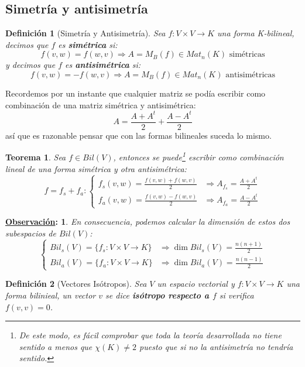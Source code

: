 \documentclass[10pt,a4paper,openright]{book}
\theoremstyle{break}
\newtheorem*{defi}{Definición}
\newtheorem*{theo}{Teorema}
\newtheorem*{obs}{\underline{Observación}:}
\begin{document}
\subsection{Simetría y antisimetría}
\begin{defi}[Simetría y Antisimetría]
Sea $f: V\times V \rightarrow K$ una forma K-bilineal, decimos que $f$ es \textbf{simétrica} si:
$$f(v,w)=f(w,v)\Rightarrow A=M_B(f)\in Mat_n(K) \mbox{ simétricas}$$
y decimos que $f$ es \textbf{antisimétrica} si:
$$f(v,w)=-f(w,v)\Rightarrow A=M_B(f)\in Mat_n(K) \mbox{ antisimétricas}$$
\end{defi}

Recordemos por un instante que cualquier matriz se podía escribir como combinación de una matriz simétrica y antisimétrica:
$$A=\frac{A+A^t}{2}+\frac{A-A^t}{2}$$
así que es razonable pensar que con las formas bilineales suceda lo mismo.

\begin{theo}
Sea $f\in Bil(V)$, entonces se puede\footnote{De este modo, es fácil comprobar que toda la teoría desarrollada no tiene sentido a menos que $\chi(K)\neq 2$ puesto que si no la antisimetría no tendría sentido.} escribir como combinación lineal de una forma simétrica y otra antisimétrica:
$$f=f_s+f_a: \begin{cases} f_s(v,w)=\frac{f(v,w)+f(w,v)}{2}& \Rightarrow A_{f_s} = \frac{A+A^t}{2} \\ f_a(v,w)=\frac{f(v,w)-f(w,v)}{2} &\Rightarrow A_{f_a} = \frac{A-A^t}{2} \end{cases}$$
\end{theo}

\begin{obs}
En consecuencia, podemos calcular la dimensión de estos dos subespacios de $Bil(V)$:
$$\begin{cases}Bil_s(V)=\{f_s: V\times V\rightarrow K\} &\Rightarrow \dim Bil_s(V)=\frac{n(n+1)}{2} \\ Bil_a(V)=\{f_a: V\times V\rightarrow K\} &\Rightarrow \dim Bil_a(V)=\frac{n(n-1)}{2}\end{cases}$$
\end{obs}


\begin{defi}[Vectores Isótropos]
Sea $V$ un espacio vectorial y $f:V \times V \rightarrow K$ una forma bilinieal, un vector $v$ se dice \textbf{isótropo respecto a $f$} si verifica $f(v,v)=0$.
\end{defi}
\end{document}
